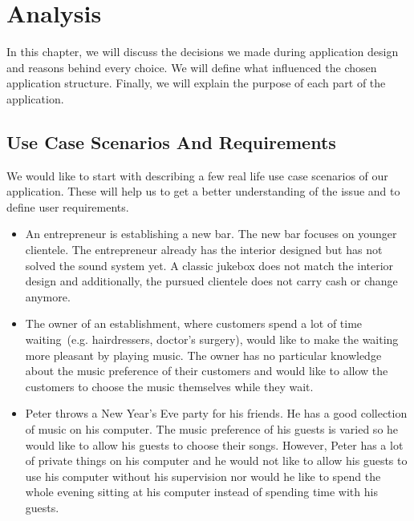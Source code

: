 \chapter{Analysis}

In this chapter, we will discuss the decisions we made during application design and reasons behind every choice. We will define what influenced the chosen application structure. Finally, we will explain the purpose of each part of the application.

\section{Use Case Scenarios And Requirements}

We would like to start with describing a few real life use case scenarios of our application. These will help us to get a better understanding of the issue and to define user requirements.
\begin{itemize}
    \item An entrepreneur is establishing a new bar. The new bar focuses on younger clientele. The entrepreneur already has the interior designed but has not solved the sound system yet. A classic jukebox does not match the interior design and additionally, the pursued clientele does not carry cash or change anymore.
    \item The owner of an establishment, where customers spend a lot of time waiting~(e.g. hairdressers, doctor's surgery), would like to make the waiting more pleasant by playing music. The owner has no particular knowledge about the music preference of their customers and would like to allow the customers to choose the music themselves while they wait.
    \item Peter throws a New Year's Eve party for his friends. He has a good collection of music on his computer. The music preference of his guests is varied so he would like to allow his guests to choose their songs. However, Peter has a lot of private things on his computer and he would not like to allow his guests to use his computer without his supervision nor would he like to spend the whole evening sitting at his computer instead of spending time with his guests.
\end{itemize}

